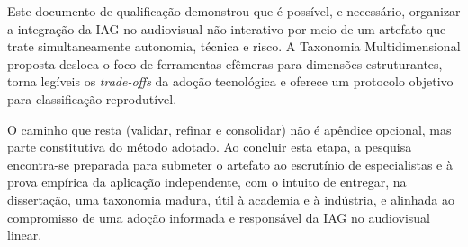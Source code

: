 Este documento de qualificação demonstrou que é possível, e necessário, organizar a integração da IAG no audiovisual não interativo por meio de um artefato que trate simultaneamente autonomia, técnica e risco. A Taxonomia Multidimensional proposta desloca o foco de ferramentas efêmeras para dimensões estruturantes, torna legíveis os \textit{trade-offs} da adoção tecnológica e oferece um protocolo objetivo para classificação reprodutível.

O caminho que resta (validar, refinar e consolidar) não é apêndice opcional, mas parte constitutiva do método adotado. Ao concluir esta etapa, a pesquisa encontra-se preparada para submeter o artefato ao escrutínio de especialistas e à prova empírica da aplicação independente, com o intuito de entregar, na dissertação, uma taxonomia madura, útil à academia e à indústria, e alinhada ao compromisso de uma adoção informada e responsável da IAG no audiovisual linear.
